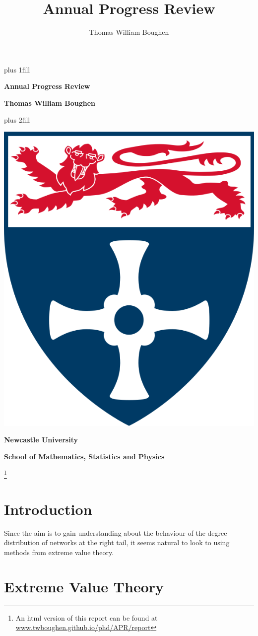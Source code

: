 \documentclass[
  10pt,
  a4paper,
]{scrreprt}
\title{Annual Progress Review}
\author{Thomas William Boughen}
\date{}
\theoremstyle{definition}
\theoremstyle{plain}
\theoremstyle{remark}
\begin{document}
\cleardoublepage
\thispagestyle{empty}
{\centering
\hbox{}\vskip 0cm plus 1fill
{\Huge\bfseries Annual Progress Review \par}
\vspace{12ex}
{\Large\bfseries Thomas William Boughen \par}
\vspace{3ex}
\vskip 0cm plus 2fill
\vspace{3ex}
{\bfseries\large  \par}
\vspace{12ex}
{\includegraphics[width=0.1\linewidth]{"imgs/University_of_Newcastle_Coat_of_Arms.png"}\par}
%
%
{\bfseries\large Newcastle University \par}
\vspace{3ex}
%
{\bfseries\large School of Mathematics, Statistics and Physics \par}
%
\vspace{12ex}
\footnote{An html version of this report can be found at \url{www.twboughen.github.io/phd/APR/report}}
\justifying
\noindent\ifdefined\Shaded\renewenvironment{Shaded}{\begin{tcolorbox}[breakable, interior hidden, boxrule=0pt, borderline west={3pt}{0pt}{shadecolor}, enhanced, frame hidden, sharp corners]}{\end{tcolorbox}}\fi

\hypertarget{sec-int}{%
\chapter{Introduction}\label{sec-int}}

Since the aim is to gain understanding about the behaviour of the degree
distribution of networks at the right tail, it seems natural to look to
using methods from extreme value theory.

\hypertarget{sec-ext}{%
\chapter{Extreme Value Theory}\label{sec-ext}}

}
\end{document}

